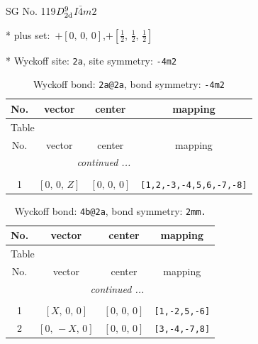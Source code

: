 \documentclass[fleqn,8pt]{jsarticle}
\begin{document}
\setcounter{MaxMatrixCols}{32}

\renewcommand{\tablename}{Table~}
\renewcommand{\figurename}{Figure~}
\begin{center}
\LARGE
SG No. 119\quad$D_{\rm 2d}^{9}$\quad$I\bar{4}m2$\quad[ tetragonal ]
\end{center}

* plus set:\,\,\,$+\left[ 0,\, 0,\, 0 \right]$,\quad $+\left[ \frac{1}{2},\, \frac{1}{2},\, \frac{1}{2} \right]$


* Wyckoff site: {\tt 2a}, site symmetry: {\tt -4m2}
\renewcommand{\arraystretch}{1.2}
\begin{longtable}{cccc}
\caption{Wyckoff bond: {\tt 2a@2a}, bond symmetry: {\tt -4m2}}
 \\
 \hline \hline
No. & vector & center & mapping \\ \hline \endfirsthead

\multicolumn{3}{l}{\tablename\ \thetable{}} \\
 \hline \hline
No. & vector & center & mapping \\ \hline \endhead

 \hline \hline
\multicolumn{3}{r}{\footnotesize\it continued ...} \\ \endfoot

 \hline \hline
\multicolumn{3}{r}{} \\ \endlastfoot

1 & $\left[ 0,\, 0,\, Z \right]$ & $\left[ 0,\, 0,\, 0 \right]$ & {\tt [1,2,-3,-4,5,6,-7,-8]} \\
\end{longtable}
\renewcommand{\arraystretch}{1.2}
\begin{longtable}{cccc}
\caption{Wyckoff bond: {\tt 4b@2a}, bond symmetry: {\tt 2mm.}}
 \\
 \hline \hline
No. & vector & center & mapping \\ \hline \endfirsthead

\multicolumn{3}{l}{\tablename\ \thetable{}} \\
 \hline \hline
No. & vector & center & mapping \\ \hline \endhead

 \hline \hline
\multicolumn{3}{r}{\footnotesize\it continued ...} \\ \endfoot

 \hline \hline
\multicolumn{3}{r}{} \\ \endlastfoot

1 & $\left[ X,\, 0,\, 0 \right]$ & $\left[ 0,\, 0,\, 0 \right]$ & {\tt [1,-2,5,-6]} \\ \hline
2 & $\left[ 0,\, - X,\, 0 \right]$ & $\left[ 0,\, 0,\, 0 \right]$ & {\tt [3,-4,-7,8]} \\
\end{longtable}
\end{document}
